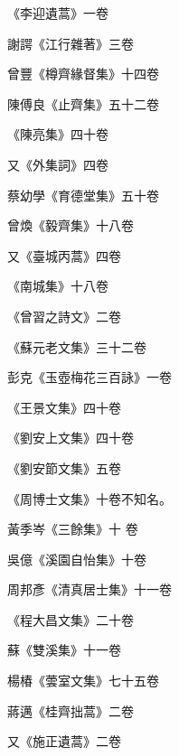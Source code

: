 \begin{pinyinscope}
 《李迎遺蒿》一卷



 謝諤《江行雜著》三卷



 曾豐《樽齊緣督集》十四卷



 陳傅良《止齊集》五十二卷



 《陳亮集》四十卷



 又《外集詞》四卷



 蔡幼學《育德堂集》五十卷



 曾煥《毅齊集》十八卷



 又《臺城丙蒿》四卷



 《南城集》十八卷



 《曾習之詩文》二卷



 《蘇元老文集》三十二卷



 彭克《玉壺梅花三百詠》一卷



 《王景文集》四十卷



 《劉安上文集》四十卷



 《劉安節文集》五卷



 《周博士文集》十卷不知名。



 黃季岑《三餘集》十
 卷



 吳億《溪園自怡集》十卷



 周邦彥《清真居士集》十一卷



 《程大昌文集》二十卷



 蘇《雙溪集》十一卷



 楊椿《蕓室文集》七十五卷



 蔣邁《桂齊拙蒿》二卷



 又《施正遺蒿》二卷




\end{pinyinscope}
